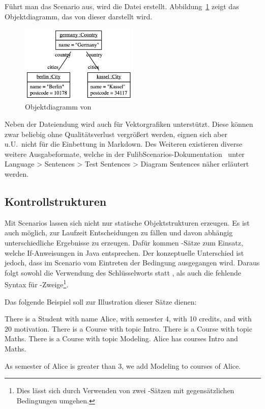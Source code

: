 Führt man das Scenario aus, wird die Datei  erstellt.
Abbildung~\ref{fig:germany.png} zeigt das Objektdiagramm, das von dieser darstellt wird.

\begin{figure}
    \centering
    \includegraphics[width=0.5\textwidth]{chapter/fulib-scenarios/img/germany.png}
    \caption{Objektdiagramm von }
    \label{fig:germany.png}
\end{figure}

Neben der Dateiendung  wird auch  für Vektorgrafiken unterstützt.
Diese können zwar beliebig ohne Qualitätsverlust vergrößert werden, eignen sich aber u.U.\ nicht für die Einbettung in Markdown.
Des Weiteren existieren diverse weitere Ausgabeformate, welche in der FulibScenarios-Dokumentation~\cite{documentation} unter Language > Sentences > Test Sentences > Diagram Sentences näher erläutert werden.

\subsection{Kontrollstrukturen}\label{subsec:control-structures}

Mit Scenarios lassen sich nicht nur statische Objektstrukturen erzeugen.
Es ist auch möglich, zur Laufzeit Entscheidungen zu fällen und davon abhängig unterschiedliche Ergebnisse zu erzeugen.
Dafür kommen -Sätze zum Einsatz, welche If-Anweisungen in Java entsprechen.
Der konzeptuelle Unterschied ist jedoch, dass im Scenario vom Eintreten der Bedingung ausgegangen wird.
Daraus folgt sowohl die Verwendung des Schlüsselworts  statt , als auch die fehlende Syntax für -Zweige\footnote{
Dies lässt sich durch Verwenden von zwei -Sätzen mit gegensätzlichen Bedingungen umgehen.
}.

Das folgende Beispiel soll zur Illustration dieser Sätze dienen:

\begin{codeblock}
    There is a Student with name Alice, with semester 4, with 10 credits, and with 20 motivation.
    There is a Course with topic Intro.
    There is a Course with topic Maths.
    There is a Course with topic Modeling.
    Alice has courses Intro and Maths.

    As semester of Alice is greater than 3, we add Modeling to courses of Alice.
\end{codeblock}

